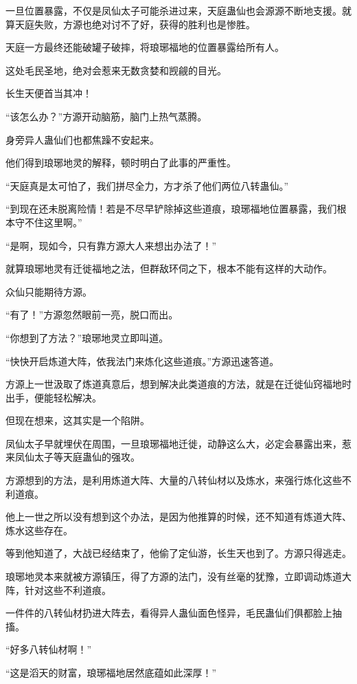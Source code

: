 \begin{this_body}
一旦位置暴露，不仅是凤仙太子可能杀进过来，天庭蛊仙也会源源不断地支援。就算天庭失败，方源也绝对讨不了好，获得的胜利也是惨胜。

天庭一方最终还能破罐子破摔，将琅琊福地的位置暴露给所有人。

这处毛民圣地，绝对会惹来无数贪婪和觊觎的目光。

长生天便首当其冲！

“该怎么办？”方源开动脑筋，脑门上热气蒸腾。

身旁异人蛊仙们也都焦躁不安起来。

他们得到琅琊地灵的解释，顿时明白了此事的严重性。

“天庭真是太可怕了，我们拼尽全力，方才杀了他们两位八转蛊仙。”

“到现在还未脱离险情！若是不尽早铲除掉这些道痕，琅琊福地位置暴露，我们根本守不住这里啊。”

“是啊，现如今，只有靠方源大人来想出办法了！”

就算琅琊地灵有迁徙福地之法，但群敌环伺之下，根本不能有这样的大动作。

众仙只能期待方源。

“有了！”方源忽然眼前一亮，脱口而出。

“你想到了方法？”琅琊地灵立即叫道。

“快快开启炼道大阵，依我法门来炼化这些道痕。”方源迅速答道。

方源上一世汲取了炼道真意后，想到解决此类道痕的方法，就是在迁徙仙窍福地时出手，便能轻松解决。

但现在想来，这其实是一个陷阱。

凤仙太子早就埋伏在周围，一旦琅琊福地迁徙，动静这么大，必定会暴露出来，惹来凤仙太子等天庭蛊仙的强攻。

方源想到的方法，是利用炼道大阵、大量的八转仙材以及炼水，来强行炼化这些不利道痕。

他上一世之所以没有想到这个办法，是因为他推算的时候，还不知道有炼道大阵、炼水这些存在。

等到他知道了，大战已经结束了，他偷了定仙游，长生天也到了。方源只得逃走。

琅琊地灵本来就被方源镇压，得了方源的法门，没有丝毫的犹豫，立即调动炼道大阵，针对这些不利道痕。

一件件的八转仙材扔进大阵去，看得异人蛊仙面色怪异，毛民蛊仙们俱都脸上抽搐。

“好多八转仙材啊！”

“这是滔天的财富，琅琊福地居然底蕴如此深厚！”


\end{this_body}

